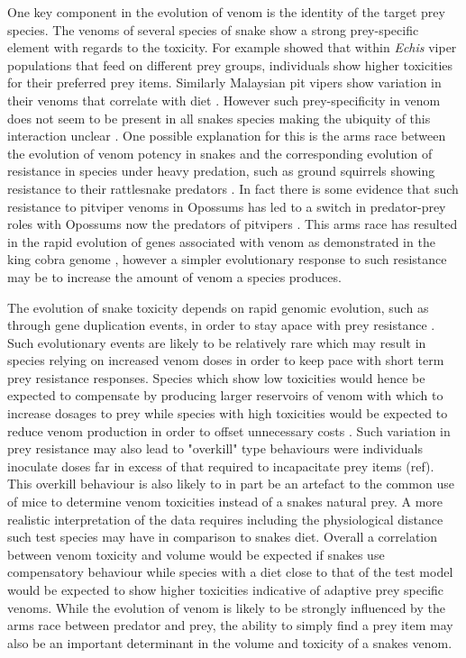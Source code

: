 One key component in the evolution of venom is the identity of the target prey species. The venoms of several species of snake show a strong prey-specific element with regards to the toxicity. For example \cite{barlow2009coevolution} showed that within \textit{Echis} viper populations that feed on different prey groups, individuals show higher toxicities for their preferred prey items. Similarly Malaysian pit vipers show variation in their venoms that correlate with diet \citep{daltry1996diet}. However such prey-specificity in venom does not seem to be present in all snakes species making the ubiquity of this interaction unclear \citep{williams1988variation}. One possible explanation for this is the arms race between the evolution of venom potency in snakes and the corresponding evolution of resistance in species under heavy predation, such as ground squirrels showing resistance to their rattlesnake predators \citep{poran1987resistance}. In fact there is some evidence that such resistance to pitviper venoms in Opossums has led to a switch in predator-prey roles with Opossums now the predators of pitvipers \citep{voss2013opossums}. This arms race has resulted in the rapid evolution of genes associated with venom as demonstrated in the king cobra genome \citep{vonk2013king}, however a simpler evolutionary response to such resistance may be to increase the amount of venom a species produces.


The evolution of snake toxicity depends on rapid genomic evolution, such as through gene duplication events, in order to stay apace with prey resistance \citep{vonk2013king}. Such evolutionary events are likely to be relatively rare which may result in species relying on increased venom doses in order to keep pace with short term prey resistance responses. Species which show low toxicities would hence be expected to compensate by producing larger reservoirs of venom with which to increase dosages to prey while species with high toxicities would be expected to reduce venom production in order to offset unnecessary costs \citep{mccue2006cost}. Such variation in prey resistance may also lead to "overkill" type behaviours were individuals inoculate doses far in excess of that required to incapacitate prey items (ref). This overkill behaviour is also likely to in part be an artefact to the common use of mice to determine venom toxicities instead of a snakes natural prey. A more realistic interpretation of the data requires including the physiological distance such test species may have in comparison to snakes diet. Overall a correlation between venom toxicity and volume would be expected if snakes use compensatory behaviour while species with a diet close to that of the test model would be expected to show higher toxicities indicative of adaptive prey specific venoms. While the evolution of venom is likely to be strongly influenced by the arms race between predator and prey, the ability to simply find a prey item may also be an important determinant in the volume and toxicity of a snakes venom.


